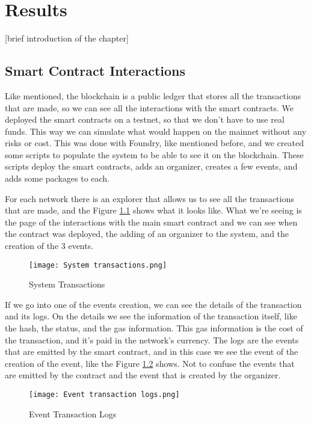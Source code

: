 \chapter{Results}
\label{ch:results}

[brief introduction of the chapter]

\section{Smart Contract Interactions}
\label{sec:smart_contract_interactions}

Like mentioned, the blockchain is a public ledger that stores all the
transactions that are made, so we can see all the interactions with the smart
contracts. We deployed the smart contracts on a testnet, so that we don't have
to use real funds. This way we can simulate what would happen on the mainnet
without any risks or cost. This was done with Foundry, like mentioned before,
and we created some scripts to populate the system to be able to see it on the
blockchain. These scripts deploy the smart contracts, adds an organizer,
creates a few events, and adds some packages to each.

For each network there is an explorer that allows us to see all the
transactions that are made, and the Figure \ref{fig:system_transactions} shows
what it looks like. What we're seeing is the page of the interactions with the
main smart contract and we can see when the contract was deployed, the adding
of an organizer to the system, and the creation of the 3 events.

\begin{figure}[H]
    \texttt{[image: System transactions.png]}
    \centering
    \caption{System Transactions}
    \label{fig:system_transactions}
\end{figure}

If we go into one of the events creation, we can see the details of the
transaction and its logs. On the details we see the information of the
transaction itself, like the hash, the status, and the gas information. This
gas information is the cost of the transaction, and it's paid in the network's
currency. The logs are the events that are emitted by the smart contract, and
in this case we see the event of the creation of the event, like the Figure
\ref{fig:event_transaction_logs} shows. Not to confuse the events that are
emitted by the contract and the event that is created by the organizer.

\begin{figure}[H]
    \texttt{[image: Event transaction logs.png]}
    \centering
    \caption{Event Transaction Logs}
    \label{fig:event_transaction_logs}
\end{figure}

